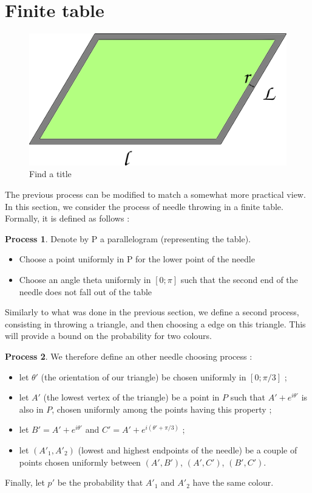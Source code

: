 \documentclass[a4paper,11pt]{article}
\theoremstyle{definition}
\newtheorem{process}{Process}
\theoremstyle{remark}
\begin{document}
\section{Finite table} \label{fini}

\begin{figure}[h]
\center
\includegraphics[scale=0.5]{tablefinie.png}
\caption{\label{tablefinie} Find a title}
\end{figure}
The previous process can be modified to match a somewhat more practical view. 
In this section, we consider the process of needle throwing in a finite table. 
Formally, it is defined as follows :
\begin{process}
Denote by P a parallelogram (representing the table). 
\begin{itemize}
\item Choose a point uniformly in P for the lower point of the needle
\item Choose an angle theta uniformly in $[0 ; \pi]$ such that the second end 
of the needle does not fall out of the table
\end{itemize}
\end{process}

Similarly to what was done in the previous section, we define a second process, 
consisting in throwing a triangle, and then choosing a edge on this triangle.
This will provide a bound on the probability for two colours.

\begin{process}
We therefore define an other needle choosing process :
\begin{itemize}
  \item let $\theta '$ (the orientation of our triangle) be chosen uniformly 
  in $[0;\pi / 3]$ ;
  \item let $A'$ (the lowest vertex of the triangle) be a point in $P$ such 
  that $A' + e^{i\theta '}$ is also in $P$, chosen uniformly among the points 
  having this property ;
  \item let $B' = A' + e^{i \theta '}$ and $C' = A' + e^{i (\theta ' + \pi / 3 ) }$ ;
  \item let $(A'_1,A'_2)$ (lowest and highest endpoints of the needle) be a 
  couple of points chosen uniformly between $(A',B')$, $(A',C')$, $(B',C')$.
\end{itemize}
Finally, let $p'$ be the probability that $A'_1$ and $A'_2$ have the same 
colour.
\end{process}
\end{document}
